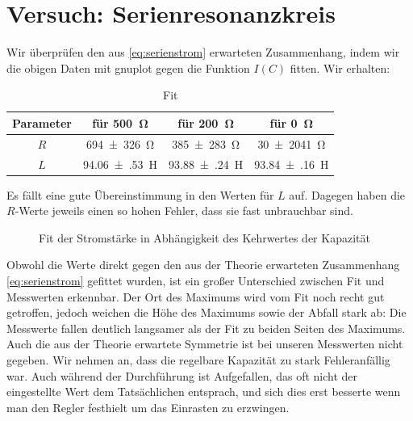 \section{Versuch: Serienresonanzkreis}
Wir überprüfen den aus \cref{eq:serienstrom} erwarteten Zusammenhang, indem wir die obigen Daten mit gnuplot gegen die Funktion $I(C)$ fitten. Wir erhalten:
\begin{table}[H]
  \centering
  \begin{tabular}{c c c c} \toprule
    Parameter & für \SI{500}{\ohm} & für \SI{200}{\ohm} & für \SI{0}{\ohm} \\ \midrule
    $R$ & \SI{694(326)}{\ohm} & \SI{385(283)}{\ohm}  & \SI{30(2041)}{\ohm} \\
    $L$ & \SI{94.06(53)}{\henry} & \SI{93.88(24)}{\henry} & \SI{93.84(16)}{\henry} \\ \bottomrule 
  \end{tabular}
  \caption{Fit}
  \label{tab:serienfit}
\end{table}
Es fällt eine gute Übereinstimmung in den Werten für $L$ auf. Dagegen haben die $R$-Werte jeweils einen so hohen Fehler, dass sie fast unbrauchbar sind.
\begin{figure}[H]
\centering
{}
\caption{Fit der Stromstärke in Abhängigkeit des Kehrwertes der Kapazität}
\label{fig:serienfit}
\end{figure}
Obwohl die Werte direkt gegen den aus der Theorie erwarteten Zusammenhang \cref{eq:serienstrom} gefittet wurden, ist ein großer Unterschied zwischen Fit und Messwerten erkennbar. Der Ort des Maximums wird vom Fit noch recht gut getroffen, jedoch weichen die Höhe des Maximums sowie der Abfall stark ab: Die Messwerte fallen deutlich langsamer als der Fit zu beiden Seiten des Maximums. Auch die aus der Theorie erwartete Symmetrie ist bei unseren Messwerten nicht gegeben. Wir nehmen an, dass die regelbare Kapazität zu stark Fehleranfällig war. Auch während der Durchführung ist Aufgefallen, das oft nicht der eingestellte Wert dem Tatsächlichen entsprach, und sich dies erst besserte wenn man den Regler festhielt um das Einrasten zu erzwingen.

